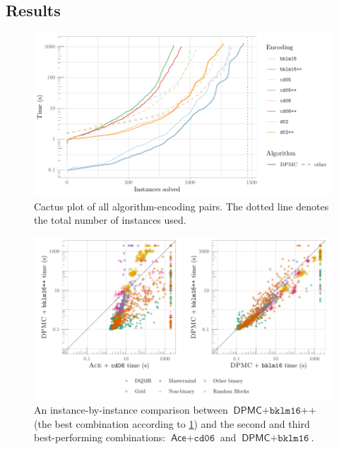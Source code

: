 \subsection{Results}

\begin{figure}
  \centering
  \includegraphics[width=\textwidth]{chapters/wmc_without_parameters/cumulative}
  \caption{Cactus plot of all algorithm-encoding pairs. The dotted line
    denotes the total number of instances used.}
  \label{fig:cumulative2}
\end{figure}

\begin{figure}
  \centering
  \includegraphics[width=\textwidth]{chapters/wmc_without_parameters/scatter}
  \caption{An instance-by-instance comparison between $\textsf{DPMC} +
    \texttt{bklm16++}$ (the best combination according to \cref{fig:cumulative2})
  and the second and third best-performing combinations: $\textsf{Ace} +
  \texttt{cd06}$ and $\textsf{DPMC} + \texttt{bklm16}$.}
  \label{fig:scatter2}
\end{figure}

